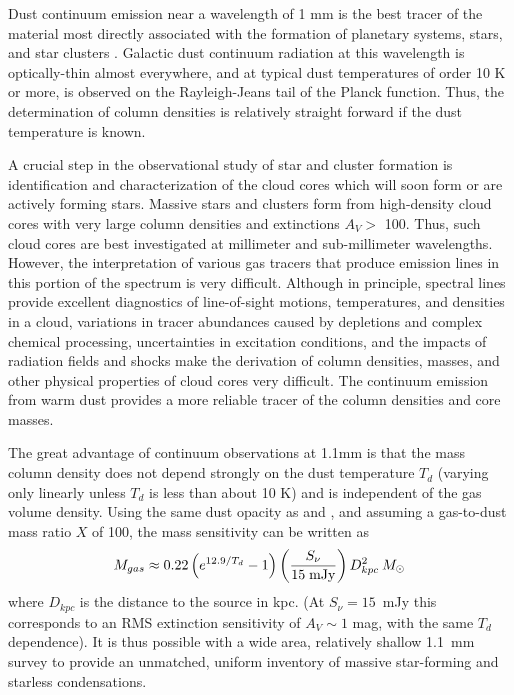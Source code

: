 \documentclass[12pt,preprint]{aastex}
\def\msol{\ifmmode {\>M_\odot}\else {$M_\odot$}\fi}
\begin{document}
Dust continuum emission near a wavelength of 1 mm is the best tracer
of the material most directly associated with the formation of
planetary systems, stars, and star clusters
\citep{johnstone06}.  Galactic dust continuum radiation at
this wavelength is optically-thin almost everywhere, and at typical
dust temperatures of order 10 K or more, is observed on the
Rayleigh-Jeans tail of the Planck function.  Thus, the determination
of column densities is relatively straight forward if the dust
temperature is known.

A crucial step in the observational study of star and cluster
formation is identification and characterization of the cloud cores
which will soon form or are actively forming stars.  Massive stars and
clusters form from high-density cloud cores with very large column
densities and extinctions $A_V > $ 100.  Thus, such cloud cores are
best investigated at millimeter and sub-millimeter wavelengths.
However, the interpretation of various gas tracers that produce
emission lines in this portion of the spectrum is very difficult.
Although in principle, spectral lines provide excellent diagnostics of
line-of-sight motions, temperatures, and densities in a cloud,
variations in tracer abundances caused by depletions and complex
chemical processing, uncertainties in excitation conditions, and the
impacts of radiation fields and shocks make the derivation of column
densities, masses, and other physical properties of cloud cores very
difficult.  The continuum emission from warm dust provides a more
reliable tracer of the column densities and core masses.

The great advantage of continuum observations at 1.1mm is that the
mass column density does not depend strongly on the dust temperature
$T_d$ (varying only linearly unless $T_d$ is less than about 10 K) and
is independent of the gas volume density.  Using the same dust opacity
as \citet{enoch06} and \citet{young06}, and assuming a gas-to-dust
mass ratio $X$ of 100, the mass sensitivity can be written as
\begin{equation} 
\label{eq:Mass}
M_{gas}\approx
0.22\left( e^{12.9/T_d}-1 \right) \left({S_\nu\over 15\; {\rm mJy}} \right)
D^{2}_{kpc} \msol 
\end{equation}
where $D_{kpc}$ is the distance to the source in kpc.  (At $S_\nu =
15$~mJy this corresponds to an RMS extinction sensitivity of $A_V\sim
1$ mag, with the same $T_d$ dependence).  It is thus possible with a
wide area, relatively shallow 1.1~mm survey to provide an unmatched,
uniform inventory of massive star-forming and starless condensations.
\end{document}
